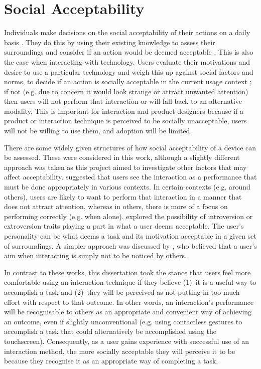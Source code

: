 \documentclass{l4proj}
\begin{document}
\section{Social Acceptability}

Individuals make decisions on the social acceptability of their actions on a daily basis \citep{pohl_focused_2013}. They do this by using their existing knowledge to assess their surroundings and consider if an action would be deemed acceptable \citep{naegele_presentation_1956}. This is also the case when interacting with technology. Users evaluate their motivations and desire to use a particular technology and weigh this up against social factors and norms, to decide if an action is socially acceptable in the current usage context \citep{rico_usable_2010}; if not (e.g. due to concern it would look strange or attract unwanted attention) then users will not perform that interaction or will fall back to an alternative modality. This is important for interaction and product designers because if a product or interaction technique is perceived to be socially unacceptable, users will not be willing to use them, and adoption will be limited.

There are some widely given structures of how social acceptability of a device can be assessed. These were considered in this work, although a slightly different approach was taken as this project aimed to investigate other factors that may affect acceptability. \citet{rico_usable_2010} suggested that users see the interaction as a performance that must be done appropriately in various contexts. In certain contexts (e.g. around others), users are likely to want to perform that interaction in a manner that does not attract attention, whereas in others, there is more of a focus on performing correctly (e.g. when alone). \citet{ahlstrom_are_2014} explored the possibility of introversion or extroversion traits playing a part in what a user deems acceptable. The user's personality can be what deems a task and its motivation acceptable in a given set of surroundings. A simpler approach was discussed by \citet{sakamoto_is_2020}, who believed that a user's aim when interacting is simply not to be noticed by others.

In contrast to these works, this dissertation took the stance that users feel more comfortable using an interaction technique if they believe (1)~it is a useful way to accomplish a task and (2)~they will be perceived as not putting in too much effort with respect to that outcome. In other words, an interaction's performance will be recognisable to others as an appropriate and convenient way of achieving an outcome, even if slightly unconventional (e.g. using contactless gestures to accomplish a task that could alternatively be accomplished using the touchscreen). Consequently, as a user gains experience with successful use of an interaction method, the more socially acceptable they will perceive it to be because they recognise it as an appropriate way of completing a task.
\end{document}
